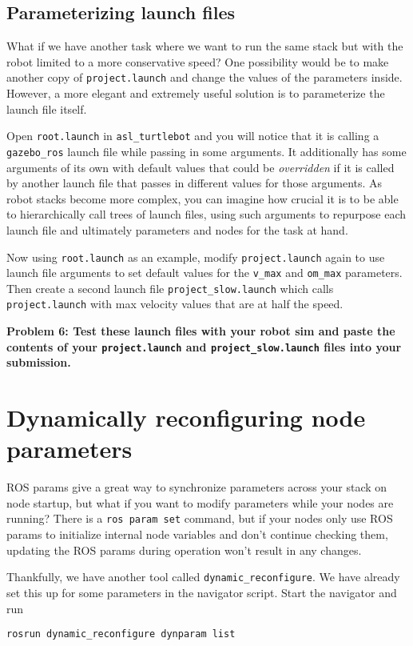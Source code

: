 \documentclass{article}
\begin{document}
\subsection{Parameterizing launch files}
What if we have another task where we want to run the same stack but with the robot limited to a more conservative speed? One possibility would be to make another copy of \texttt{project.launch} and change the values of the parameters inside. However, a more elegant and extremely useful solution is to parameterize the launch file itself.

Open \texttt{root.launch} in \texttt{asl\_turtlebot} and you will notice that it is calling a \texttt{gazebo\_ros} launch file while passing in some arguments. It additionally has some arguments of its own with default values that could be \textit{overridden} if it is called by another launch file that passes in different values for those arguments. As robot stacks become more complex, you can imagine how crucial it is to be able to hierarchically call trees of launch files, using such arguments to repurpose each launch file and ultimately parameters and nodes for the task at hand.

Now using \texttt{root.launch} as an example, modify \texttt{project.launch} again to use launch file arguments to set default values for the \texttt{v\_max} and \texttt{om\_max} parameters. Then create a second launch file \texttt{project\_slow.launch} which calls \texttt{project.launch} with max velocity values that are at half the speed.

{\bf Problem 6: Test these launch files with your robot sim and paste the contents of your \texttt{project.launch} and \texttt{project\_slow.launch} files into your submission.}

\section{Dynamically reconfiguring node parameters}
ROS params give a great way to synchronize parameters across your stack on node startup, but what if you want to modify parameters while your nodes are running? There is a \texttt{ros param set} command, but if your nodes only use ROS params to initialize internal node variables and don't continue checking them, updating the ROS params during operation won't result in any changes.

Thankfully, we have another tool called \texttt{dynamic\_reconfigure}. We have already set this up for some parameters in the navigator script. Start the navigator and run
\begin{lstlisting}
rosrun dynamic_reconfigure dynparam list
\end{lstlisting}
\end{document}
